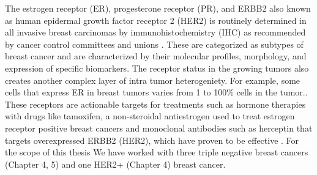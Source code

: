The estrogen receptor (ER), progesterone receptor (PR), and ERBB2 also known as human epidermal growth factor receptor 2 (HER2) is routinely determined in all invasive breast carcinomas by immunohistochemistry (IHC) as recommended by cancer control committees and unions \cite{turashvili2017tumor, hammond2010college, wolff2013american}. These are categorized as subtypes of breast cancer and are characterized by their molecular profiles, morphology, and expression of specific biomarkers. The receptor status in the growing tumors also creates another complex layer of intra tumor heterogeniety. For example, some cells that express ER in breast tumors varies from 1 to 100\% cells in the tumor.\cite{januvskevivciene2019heterogeneity, visvader2011cells}. These receptors are actionable targets for treatments such as hormone therapies with drugs like tamoxifen, a non-steroidal antiestrogen used to treat estrogen receptor positive breast cancers \cite{jordan2003tamoxifen,fisher2005tamoxifen} and monoclonal antibodies such as herceptin that targets overexpressed ERBB2 (HER2), which have proven to be effective \cite{piccart2005trastuzumab,slamon2011adjuvant}.  
For the scope of this thesis We have worked with three triple negative breast cancers (Chapter 4, 5) and one HER2+ (Chapter 4) breast cancer.

